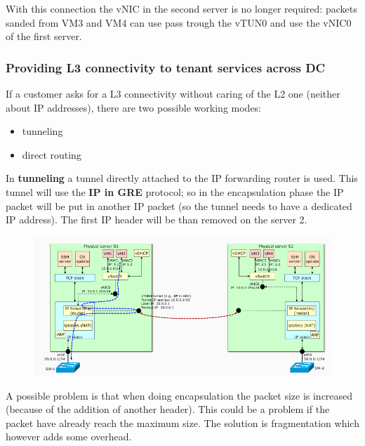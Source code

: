         With this connection the vNIC in the second server is no longer required: packets sanded from VM3 and VM4 can use pass trough the vTUN0 and use the vNIC0 of the first server.
        
        
    \subsubsection{Providing L3 connectivity to tenant services across DC}
        If a customer asks for a L3 connectivity without caring of the L2 one (neither about IP addresses), there are two possible working modes:
        \begin{itemize}
            \item tunneling
            \item direct routing
        \end{itemize}
        
        \FloatBarrier
        In \textbf{tunneling} a tunnel directly attached to the IP forwarding router is used. This tunnel will use the \textbf{IP in GRE} protocol; so in the encapsulation phase the IP packet will be put in another IP packet (so the tunnel needs to have a dedicated IP address).
        The first IP header will be than removed on the server 2.
        \begin{figure}[h!]
            \centering
            \includegraphics[scale=0.5]{images/tunneling.png}
        \end{figure}
        \FloatBarrier
        
        A possible problem is that when doing encapsulation the packet size is increased (because of the addition of another header). This could be a problem if the packet have already reach the maximum size. The solution is fragmentation which however adds some overhead.
        
